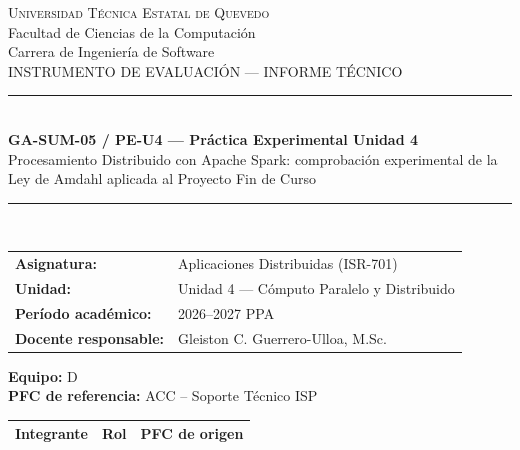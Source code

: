 \documentclass[11pt,a4paper]{article}
\title{}
\author{}
\date{}
\begin{document}
    \begin{titlepage}
        \centering
        \vspace*{1cm}

        {\large\textsc{Universidad Técnica Estatal de Quevedo}}\\[0.2cm]
        {\normalsize Facultad de Ciencias de la Computación}\\
        {\normalsize Carrera de Ingeniería de Software}\\[1.2cm]

        {\small INSTRUMENTO DE EVALUACIÓN --- INFORME TÉCNICO}\\[0.3cm]

        \rule{\linewidth}{0.5pt}\\[0.4cm]

        {\Large\bfseries
        GA-SUM-05 / PE-U4 --- Práctica Experimental Unidad 4}\\[0.4cm]

        {\large
        Procesamiento Distribuido con Apache Spark:
        comprobación experimental de la Ley de Amdahl aplicada al
        Proyecto Fin de Curso}\\[0.4cm]

        \rule{\linewidth}{0.5pt}\\[0.8cm]

        \begin{tabular}{ll}
            \textbf{Asignatura:}         & Aplicaciones Distribuidas (ISR-701) \\
            \textbf{Unidad:}             & Unidad 4 --- Cómputo Paralelo y Distribuido \\
            \textbf{Período académico:}  & 2026--2027 PPA \\
            \textbf{Docente responsable:}& Gleiston C. Guerrero-Ulloa, M.Sc. \\
        \end{tabular}

        \vspace{0.8cm}

        \textbf{Equipo:} D\\
        \textbf{PFC de referencia:} ACC -- Soporte Técnico ISP\\[0.5cm]

        \small
        \begin{tabular}{p{5.0cm} p{4.2cm} p{3.8cm}}
            \toprule
            \textbf{Integrante} & \textbf{Rol} & \textbf{PFC de origen} \\
            \midrule


\end{tabular}
\end{titlepage}
\end{document}
